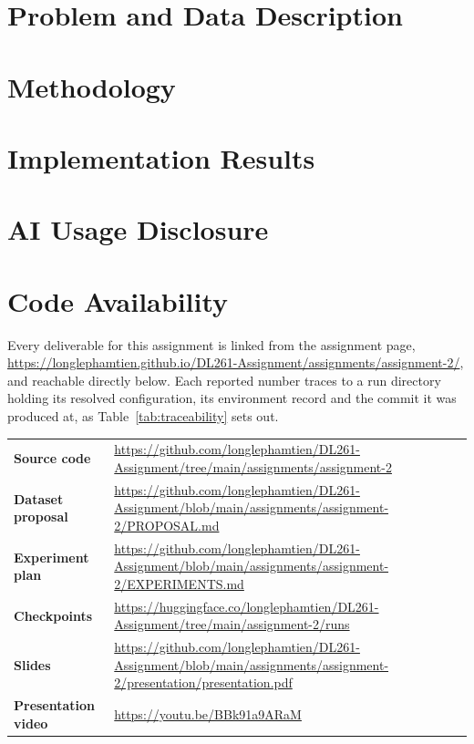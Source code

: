 \documentclass[a4paper]{article}
\theoremstyle{definition}
\begin{document}
\pagebreak
\tableofcontents
\pagebreak
\listoffigures{}
\listoftables{}
\pagebreak

\section{Problem and Data Description}
\label{sec:problem-and-data}


\section{Methodology}
\label{sec:methodology}


\section{Implementation Results}
\label{sec:results}


\section{AI Usage Disclosure}
\label{sec:ai-usage}


\section*{Code Availability}
Every deliverable for this assignment is linked from the assignment page,
\url{https://longlephamtien.github.io/DL261-Assignment/assignments/assignment-2/}, and reachable
directly below. Each reported number traces to a run directory holding its resolved
configuration, its environment record and the commit it was produced at, as
Table~\ref{tab:traceability} sets out.

\noindent\begin{tabularx}{\textwidth}{lX}
\hline
\textbf{Source code} & \url{https://github.com/longlephamtien/DL261-Assignment/tree/main/assignments/assignment-2} \\
\textbf{Dataset proposal} & \url{https://github.com/longlephamtien/DL261-Assignment/blob/main/assignments/assignment-2/PROPOSAL.md} \\
\textbf{Experiment plan} & \url{https://github.com/longlephamtien/DL261-Assignment/blob/main/assignments/assignment-2/EXPERIMENTS.md} \\
\textbf{Checkpoints} & \url{https://huggingface.co/longlephamtien/DL261-Assignment/tree/main/assignment-2/runs} \\
\textbf{Slides} & \url{https://github.com/longlephamtien/DL261-Assignment/blob/main/assignments/assignment-2/presentation/presentation.pdf} \\
\textbf{Presentation video} & \url{https://youtu.be/BBk91a9ARaM} \\
\hline
\end{tabularx}
\end{document}
